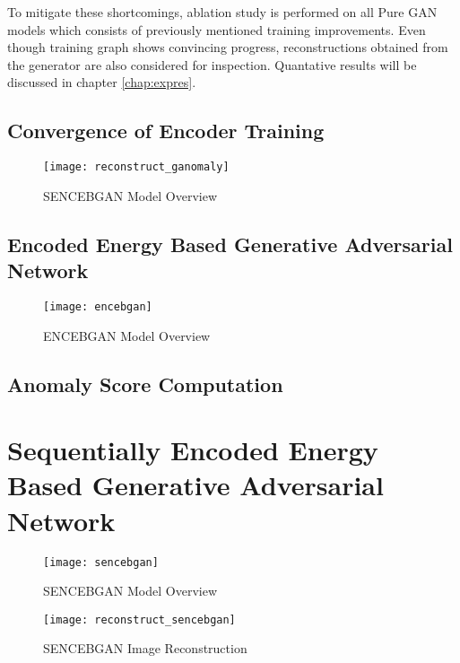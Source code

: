 To mitigate these shortcomings, ablation study is performed on all Pure GAN models which consists of previously mentioned training 
improvements. Even though training graph shows convincing progress, reconstructions obtained from the generator are also considered 
for inspection. Quantative results will be discussed in chapter \ref{chap:expres}.




\subsection{Convergence of Encoder Training}

\begin{figure}[h!]
	\centering
	\texttt{[image: reconstruct\_ganomaly]}
	\caption{SENCEBGAN Model Overview }
	\label{fig:sencebgan_model}
\end{figure}

\subsection{Encoded Energy Based Generative Adversarial Network}
\label{sec:encebgan}

\begin{figure}[h!]
	\centering
	\texttt{[image: encebgan]}
	\caption{ENCEBGAN Model Overview }
	\label{fig:encebgan_model}
\end{figure}

\subsection{Anomaly Score Computation}


\section{Sequentially Encoded Energy Based Generative Adversarial Network}
\label{sec:sencebgan}

\begin{figure}[h!]
	\centering
	\texttt{[image: sencebgan]}
	\caption{SENCEBGAN Model Overview }
	\label{fig:sencebgan_model}
\end{figure}

\begin{figure}[h!]
	\centering
	\texttt{[image: reconstruct\_sencebgan]}
	\caption{SENCEBGAN Image Reconstruction  }
	\label{fig:sencebgan_model}
\end{figure}



\endgroup